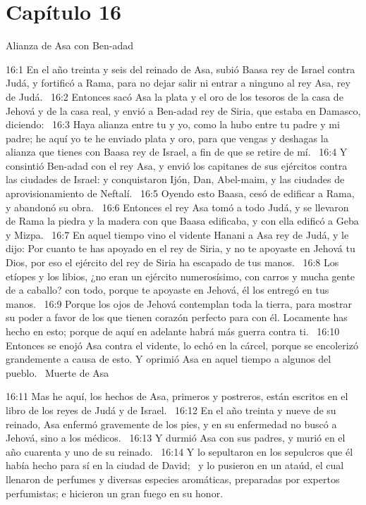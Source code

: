 															\section*{Capítulo 16}
																Alianza de Asa con Ben-adad  
																
																
																16:1 En el año treinta y seis del reinado de Asa, subió Baasa rey de Israel contra Judá, y fortificó a Rama, para no dejar salir ni entrar a ninguno al rey Asa, rey de Judá.  
																16:2 Entonces sacó Asa la plata y el oro de los tesoros de la casa de Jehová y de la casa real, y envió a Ben-adad rey de Siria, que estaba en Damasco, diciendo:  
																16:3 Haya alianza entre tu y yo, como la hubo entre tu padre y mi padre; he aquí yo te he enviado plata y oro, para que vengas y deshagas la alianza que tienes con Baasa rey de Israel, a fin de que se retire de mí.  
																16:4 Y consintió Ben-adad con el rey Asa, y envió los capitanes de sus ejércitos contra las ciudades de Israel: y conquistaron Ijón, Dan, Abel-maim, y las ciudades de aprovisionamiento de Neftalí.  
																16:5 Oyendo esto Baasa, cesó de edificar a Rama, y abandonó su obra.  
																16:6 Entonces el rey Asa tomó a todo Judá, y se llevaron de Rama la piedra y la madera con que Baasa edificaba, y con ella edificó a Geba y Mizpa.  
																16:7 En aquel tiempo vino el vidente Hanani a Asa rey de Judá, y le dijo: Por cuanto te has apoyado en el rey de Siria, y no te apoyaste en Jehová tu Dios, por eso el ejército del rey de Siria ha escapado de tus manos.  
																16:8 Los etíopes y los libios, ¿no eran un ejército numerosísimo, con carros y mucha gente de a caballo? con todo, porque te apoyaste en Jehová, él los entregó en tus manos.  
																16:9 Porque los ojos de Jehová contemplan toda la tierra, para mostrar su poder a favor de los que tienen corazón perfecto para con él. Locamente has hecho en esto; porque de aquí en adelante habrá más guerra contra ti.  
																16:10 Entonces se enojó Asa contra el vidente, lo echó en la cárcel, porque se encolerizó grandemente a causa de esto. Y oprimió Asa en aquel tiempo a algunos del pueblo.  
																Muerte de Asa  
																
																16:11 Mas he aquí, los hechos de Asa, primeros y postreros, están escritos en el libro de los reyes de Judá y de Israel.  
																16:12 En el año treinta y nueve de su reinado, Asa enfermó gravemente de los pies, y en su enfermedad no buscó a Jehová, sino a los médicos.  
																16:13 Y durmió Asa con sus padres, y murió en el año cuarenta y uno de su reinado.  
																16:14 Y lo sepultaron en los sepulcros que él había hecho para sí en la ciudad de David;  
																y lo pusieron en un ataúd, el cual llenaron de perfumes y diversas especies aromáticas, preparadas por expertos perfumistas; e hicieron un gran fuego en su honor.  

